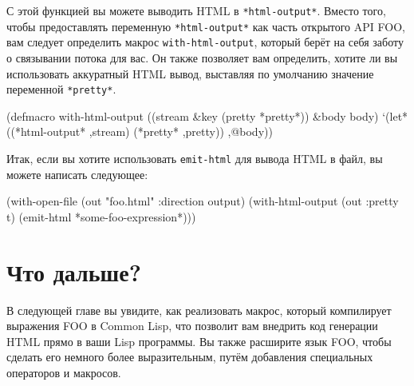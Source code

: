 С этой функцией вы можете выводить HTML в \lstinline{*html-output*}. Вместо того, чтобы
предоставлять переменную \lstinline{*html-output*} как часть открытого API FOO, вам следует
определить макрос \lstinline{with-html-output}, который берёт на себя заботу о связывании
потока для вас. Он также позволяет вам определить, хотите ли вы использовать аккуратный
HTML вывод, выставляя по умолчанию значение переменной \lstinline{*pretty*}.

\begin{myverb}
(defmacro with-html-output ((stream &key (pretty *pretty*)) &body body)
  `(let* ((*html-output* ,stream)
          (*pretty* ,pretty))
    ,@body))
\end{myverb}

Итак, если вы хотите использовать \lstinline{emit-html} для вывода HTML в файл, вы можете
написать следующее:

\begin{myverb}
(with-open-file (out "foo.html" :direction output)
  (with-html-output (out :pretty t)
    (emit-html *some-foo-expression*)))
\end{myverb}

\section{Что дальше?}

В следующей главе вы увидите, как реализовать макрос, который компилирует выражения FOO в
Common Lisp, что позволит вам внедрить код генерации HTML прямо в ваши Lisp программы. Вы
также расширите язык FOO, чтобы сделать его немного более выразительным, путём добавления
специальных операторов и макросов.

